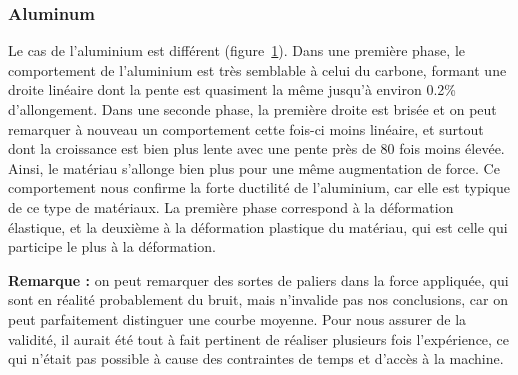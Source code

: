 \subsubsection{Aluminum}
\begin{figure}[!htb]
    \centering
    
    \label{fig:plot_alu}
\end{figure}
Le cas de l'aluminium est différent (figure~\ref{fig:plot_alu}).
Dans une première phase, le comportement de l'aluminium est très semblable à celui du carbone, formant une droite linéaire dont la pente est quasiment la même jusqu'à environ 0.2\% d'allongement.
Dans une seconde phase, la première droite est brisée et on peut remarquer à nouveau un comportement cette fois-ci moins linéaire, et surtout dont la croissance est bien plus lente avec une pente près de 80 fois moins élevée.
Ainsi, le matériau s'allonge bien plus pour une même augmentation de force.
Ce comportement nous confirme la forte ductilité de l'aluminium, car elle est typique de ce type de matériaux.
La première phase correspond à la déformation élastique, et la deuxième à la déformation plastique du matériau, qui est celle qui participe le plus à la déformation.

\textbf{Remarque : }on peut remarquer des sortes de paliers dans la force appliquée, qui sont en réalité probablement du bruit, mais n'invalide pas nos conclusions, car on peut parfaitement distinguer une courbe moyenne.
Pour nous assurer de la validité, il aurait été tout à fait pertinent de réaliser plusieurs fois l'expérience, ce qui n'était pas possible à cause des contraintes de temps et d'accès à la machine.


